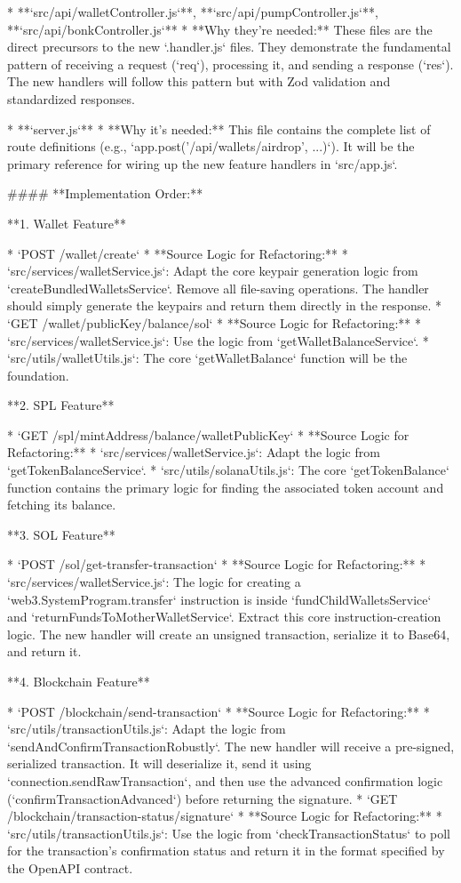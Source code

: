 *   **`src/api/walletController.js`**, **`src/api/pumpController.js`**, **`src/api/bonkController.js`**
    *   **Why they're needed:** These files are the direct precursors to the new `.handler.js` files. They demonstrate the fundamental pattern of receiving a request (`req`), processing it, and sending a response (`res`). The new handlers will follow this pattern but with Zod validation and standardized responses.

*   **`server.js`**
    *   **Why it's needed:** This file contains the complete list of route definitions (e.g., `app.post('/api/wallets/airdrop', ...)`). It will be the primary reference for wiring up the new feature handlers in `src/app.js`.

#### **Implementation Order:**

**1. Wallet Feature**

*   `POST /wallet/create`
    *   **Source Logic for Refactoring:**
        *   `src/services/walletService.js`: Adapt the core keypair generation logic from `createBundledWalletsService`. Remove all file-saving operations. The handler should simply generate the keypairs and return them directly in the response.
*   `GET /wallet/{publicKey}/balance/sol`
    *   **Source Logic for Refactoring:**
        *   `src/services/walletService.js`: Use the logic from `getWalletBalanceService`.
        *   `src/utils/walletUtils.js`: The core `getWalletBalance` function will be the foundation.

**2. SPL Feature**

*   `GET /spl/{mintAddress}/balance/{walletPublicKey}`
    *   **Source Logic for Refactoring:**
        *   `src/services/walletService.js`: Adapt the logic from `getTokenBalanceService`.
        *   `src/utils/solanaUtils.js`: The core `getTokenBalance` function contains the primary logic for finding the associated token account and fetching its balance.

**3. SOL Feature**

*   `POST /sol/get-transfer-transaction`
    *   **Source Logic for Refactoring:**
        *   `src/services/walletService.js`: The logic for creating a `web3.SystemProgram.transfer` instruction is inside `fundChildWalletsService` and `returnFundsToMotherWalletService`. Extract this core instruction-creation logic. The new handler will create an unsigned transaction, serialize it to Base64, and return it.

**4. Blockchain Feature**

*   `POST /blockchain/send-transaction`
    *   **Source Logic for Refactoring:**
        *   `src/utils/transactionUtils.js`: Adapt the logic from `sendAndConfirmTransactionRobustly`. The new handler will receive a pre-signed, serialized transaction. It will deserialize it, send it using `connection.sendRawTransaction`, and then use the advanced confirmation logic (`confirmTransactionAdvanced`) before returning the signature.
*   `GET /blockchain/transaction-status/{signature}`
    *   **Source Logic for Refactoring:**
        *   `src/utils/transactionUtils.js`: Use the logic from `checkTransactionStatus` to poll for the transaction's confirmation status and return it in the format specified by the OpenAPI contract.

